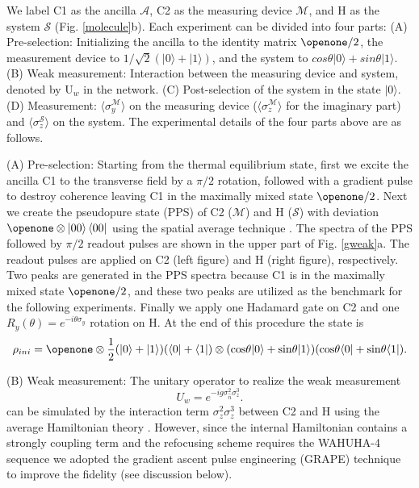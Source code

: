 \documentclass[aps,pra,12pt,onecolumn,showpacs,superscriptaddress,floatfix,footinbib,subfigure]{revtex4}
\def\bra#1{\mathinner{\langle{#1}|}}
\def\ket#1{\mathinner{|{#1}\rangle}}
\def\es{{\mathcal{S}}}
\def\md{{\mathcal{M}}}
\def\ea{{\mathcal{A}}}
\def\kb#1{\ket{#1}\bra{#1}}
\begin{document}
We label C1 as the ancilla $\ea$, C2 as the measuring device $\md$, and H as the system $\es$ (Fig. \ref{molecule}b). Each experiment can be divided into four parts: (A) Pre-selection: Initializing the ancilla to the identity matrix $\openone/2$, the measurement device to $1/\sqrt{2}(|0\rangle+|1\rangle) $, and the system to $cos\theta|0\rangle+sin\theta|1\rangle$. (B) Weak measurement: Interaction between the measuring device and system, denoted by U$_w$ in the network. (C) Post-selection of the system in the state $|0\rangle$. (D) Measurement:  $\langle \sigma_y^\md \rangle$  on the measuring device ($\langle \sigma_z^\md \rangle$ for the imaginary part) and $\langle \sigma_z ^\es \rangle$ on the system. The experimental details of the four  parts above are as follows.

 (A) Pre-selection:  Starting from the thermal equilibrium state, first we excite the ancilla C1 to the transverse field by a $\pi/2$ rotation, followed with a gradient pulse to destroy  coherence leaving   C1 in the maximally mixed state $\openone/2$. Next we create the pseudopure state (PPS) of   C2 ($\md$) and  H ($\es$) with deviation $\openone \otimes \kb{00}$ using the spatial average technique \cite{spatial}. The spectra of the PPS followed by $\pi/2$ readout pulses are shown in the upper part of Fig. \ref{gweak}a. The readout pulses are applied on C2 (left figure) and H (right figure), respectively. Two peaks are generated in the PPS spectra because C1 is in the maximally mixed state $\openone/2$, and these two peaks are utilized as the benchmark for the following experiments. Finally  we apply one Hadamard gate on C2 and one $R_y(\theta) = e^{-i\theta\sigma_y}$ rotation on H. At the end of this procedure the state is
 \begin{eqnarray}\label{pps}
 \rho_{ini}= \openone\otimes \frac{1}{2} (|0\rangle + |1\rangle) (\langle 0 | + \langle 1 |) \otimes  (\mathrm{cos} \theta|0\rangle + \mathrm{sin}\theta|1\rangle)(\mathrm{cos}\theta\langle 0 | + \mathrm{sin}\theta\langle 1 |).
 \end{eqnarray}

 (B) Weak measurement:  The unitary operator to realize the weak measurement
 \begin{equation}\label{uw}
U_w=e^{-ig\sigma_{\hat{n}}^2 \sigma_z^3}.
 \end{equation}
 can be simulated by the interaction term $\sigma_z^2\sigma_z^3$ between C2 and H using the average Hamiltonian theory \cite{ernstbook}. However, since the internal Hamiltonian contains a strongly coupling term and the refocusing scheme requires the  WAHUHA-4 sequence \cite{wahuha} we  adopted the gradient ascent pulse engineering (GRAPE) technique \cite{grape1,grape2}  to improve the fidelity (see discussion below).
\end{document}
